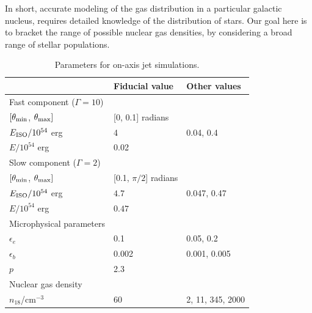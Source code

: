 \documentclass[usenatbib,fleqn]{mnras}
\begin{document}
In short, accurate modeling of the gas distribution in a particular
galactic nucleus, requires detailed knowledge of the distribution of
stars. Our goal here is to bracket the range of possible nuclear gas
densities, by considering a broad range of stellar populations.




\begin{table}
\begin{threeparttable}
  \caption{\label{tab:jetParams} Parameters for on-axis jet simulations.}
  \begin{tabular*}{0.95\columnwidth}{lll}
\hline
& Fiducial value & Other values \\
\hline\hline
    Fast component ($\Gamma=10$) &  &  \\ 
    \hline
    $[\theta_{\rm min}$, $\theta_{\rm max}]$ & [0, 0.1] radians & \\
    $E_{\rm ISO}/10^{54}$ erg & 4  & 0.04, 0.4\\
    $E/10^{54}$ erg & 0.02 & \\
    \hline 
    Slow component ($\Gamma=2$)\\
\hline
    $[\theta_{\rm min}$, $\theta_{\rm max}]$ & [0.1, $\pi/2$] radians
    & \\
    $E_{\rm ISO}/10^{54}$ erg & $4.7$ & 0.047, 0.47 \\
    $E/10^{54}$  erg & $0.47$ & \\
    \hline
    Microphysical parameters\\
\hline
    $\epsilon_e$ & 0.1 &  0.05, 0.2\\
    $\epsilon_b$ & 0.002 & 0.001, 0.005\\
    $p$ & 2.3\\
    \hline 
    Nuclear gas density \\
\hline
    $n_{18}$/cm$^{-3}$ & 60 & 2, 11, 345, 2000
  \end{tabular*}
\end{threeparttable}
\end{table}
\end{document}
